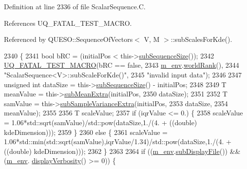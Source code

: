 Definition at line 2336 of file Scalar\-Sequence.\-C.



References U\-Q\-\_\-\-F\-A\-T\-A\-L\-\_\-\-T\-E\-S\-T\-\_\-\-M\-A\-C\-R\-O.



Referenced by Q\-U\-E\-S\-O\-::\-Sequence\-Of\-Vectors$<$ V, M $>$\-::sub\-Scales\-For\-Kde().


\begin{DoxyCode}
2340 \{
2341   \textcolor{keywordtype}{bool} bRC = (initialPos < this->\hyperlink{class_q_u_e_s_o_1_1_scalar_sequence_a0288ea295eedc216a1617b3286f6f3a0}{subSequenceSize}());
2342   \hyperlink{_defines_8h_a56d63d18d0a6d45757de47fcc06f574d}{UQ\_FATAL\_TEST\_MACRO}(bRC == \textcolor{keyword}{false},
2343                       \hyperlink{class_q_u_e_s_o_1_1_scalar_sequence_a71618cd6351b29361b437af68447a4c8}{m\_env}.\hyperlink{class_q_u_e_s_o_1_1_base_environment_a78b57112bbd0e6dd0e8afec00b40ffa7}{worldRank}(),
2344                       \textcolor{stringliteral}{"ScalarSequence<V>::subScaleForKde()"},
2345                       \textcolor{stringliteral}{"invalid input data"});
2346 
2347   \textcolor{keywordtype}{unsigned} \textcolor{keywordtype}{int} dataSize = this->\hyperlink{class_q_u_e_s_o_1_1_scalar_sequence_a0288ea295eedc216a1617b3286f6f3a0}{subSequenceSize}() - initialPos;
2348 
2349   T meanValue = this->\hyperlink{class_q_u_e_s_o_1_1_scalar_sequence_a65e9208ee2d0443ad28b29141297153c}{subMeanExtra}(initialPos,
2350                                    dataSize);
2351 
2352   T samValue = this->\hyperlink{class_q_u_e_s_o_1_1_scalar_sequence_a96aa7ad157eb648ffd65f99008609200}{subSampleVarianceExtra}(initialPos,
2353                                             dataSize,
2354                                             meanValue);
2355 
2356   T scaleValue;
2357   \textcolor{keywordflow}{if} (iqrValue <= 0.) \{
2358     scaleValue = 1.06*std::sqrt(samValue)/std::pow(dataSize,1./(4. + ((\textcolor{keywordtype}{double}) kdeDimension)));
2359    \}
2360   \textcolor{keywordflow}{else} \{
2361     scaleValue = 1.06*std::min(std::sqrt(samValue),iqrValue/1.34)/std::pow(dataSize,1./(4. + ((\textcolor{keywordtype}{double}) 
      kdeDimension)));
2362   \}
2363 
2364   \textcolor{keywordflow}{if} ((\hyperlink{class_q_u_e_s_o_1_1_scalar_sequence_a71618cd6351b29361b437af68447a4c8}{m\_env}.\hyperlink{class_q_u_e_s_o_1_1_base_environment_a8a0064746ae8dddfece4229b9ad374d6}{subDisplayFile}()) && (\hyperlink{class_q_u_e_s_o_1_1_scalar_sequence_a71618cd6351b29361b437af68447a4c8}{m\_env}.
      \hyperlink{class_q_u_e_s_o_1_1_base_environment_a1fe5f244fc0316a0ab3e37463f108b96}{displayVerbosity}() >= 0)) \{

\end{DoxyCode}
